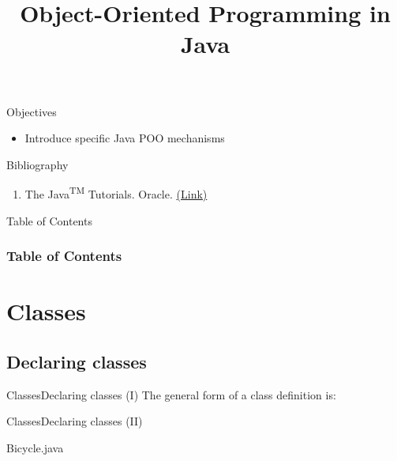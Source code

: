 \documentclass[10pt,compress]{beamer} %
\title[OOP concepts]{Object-Oriented Programming in Java}
\author{}
\institute{\asignatura}
\date{}
\begin{document}
{\titlepageBlue
    \begin{frame}
        \titlepage
    \end{frame}
}

\begin{frame}[plain]{}
   \begin{block}{Objectives}
      \begin{itemize}
         \item Introduce specific Java POO mechanisms
      \end{itemize} 
   \end{block}

   \begin{block}{Bibliography}
      \begin{enumerate}
          \item The Java\textsuperscript{TM} Tutorials. Oracle. \href{https://docs.oracle.com/javase/tutorial/}{(Link)}
      \end{enumerate} 
   \end{block}
\end{frame}

{
\eliminarNavegacion
\begin{frame}[shrink]{Table of Contents}
 \frametitle{Table of Contents}
 \tableofcontents
\end{frame}
}

\section{Classes}
\subsection{Declaring classes}

\begin{frame}{Classes}{Declaring classes (I)}
		The general form of a class definition is:
		\bigskip
		\vspace{-0.3cm}
			
\end{frame}

\begin{frame}[shrink]{Classes}{Declaring classes (II)}
		\vspace{-0.3cm}
		\begin{block}{Bicycle.java}
		\vspace{-0.3cm}
			
		\end{block}
\end{frame}
\end{document}
